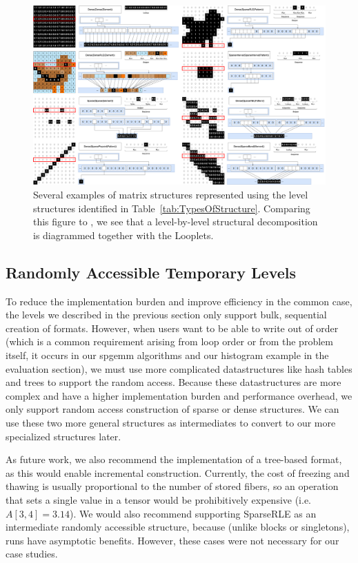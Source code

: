     \begin{figure}
        \centering
        \includegraphics[width=\linewidth]{Structures.png}\hfill%
        \caption{Several examples of matrix structures represented using the
        level structures identified in Table~\ref{tab:TypesOfStructure}.
        Comparing this figure to \cite[Figure 3]{ahrens_looplets_2023}, we see
        that a level-by-level structural decomposition is diagrammed together
        with the Looplets.}
        \label{fig:structuraldiversity}
    \end{figure}

\subsection{Randomly Accessible Temporary Levels}
To reduce the implementation burden and improve efficiency in the common case, the levels we described in the previous section only support bulk,
sequential creation of formats. However, when users want to be able to write out
of order (which is a common requirement arising from loop order or from the
problem itself, it occurs in our spgemm algorithms and our histogram example in
the evaluation section), we must use more complicated datastructures like hash
tables and trees to support the random access. Because these datastructures are
more complex and have a higher implementation burden and performance overhead,
we only support random access construction of sparse or dense structures.  We
can use these two more general structures as intermediates to convert to our
more specialized structures later.

As future work, we also recommend the implementation of a tree-based format, as
this would enable incremental construction. Currently, the cost of freezing and
thawing is usually proportional to the number of stored fibers, so an operation
that sets a single value in a tensor would be prohibitively expensive (i.e.
$A[3, 4] = 3.14$). We would also recommend supporting SparseRLE as an
intermediate randomly accessible structure, because (unlike blocks or
singletons), runs have asymptotic benefits. However, these cases were not
necessary for our case studies.

